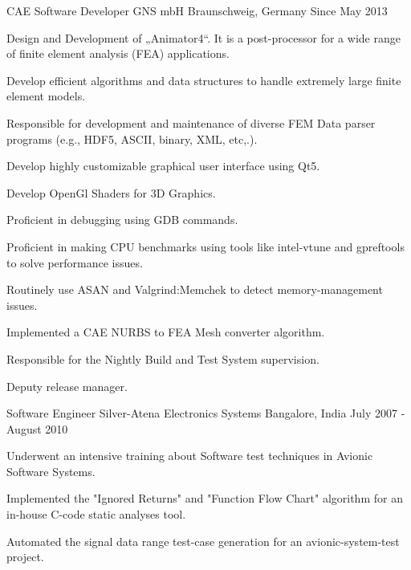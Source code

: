 
\begin{cventries}
\cventry
    {CAE Software Developer}
    {GNS mbH}
    {Braunschweig, Germany}
    {Since May 2013 }
    {
      \begin{cvitems}
        \item {Design and Development of „Animator4“. It is a post-processor for a wide range of finite element analysis (FEA) applications.}
        \item {Develop efficient algorithms and data structures to handle extremely large finite element models.}
        \item {Responsible for development and maintenance of diverse FEM Data parser programs (e.g., HDF5, ASCII, binary, XML, etc,.).}
        \item {Develop highly customizable graphical user interface using Qt5.}
        \item {Develop OpenGl Shaders for 3D Graphics.}
        \item {Proficient in debugging using GDB commands.}
        \item {Proficient in making CPU benchmarks using tools like intel-vtune and gpreftools to solve performance issues.}
        \item {Routinely use ASAN and Valgrind:Memchek to detect memory-management issues.}
        \item {Implemented a CAE NURBS to FEA Mesh converter algorithm.}
        \item {Responsible for the Nightly Build and Test System supervision.}
        \item {Deputy release manager.}
      \end{cvitems}
    }

\cventry
    {Software Engineer}
    {Silver-Atena Electronics Systems }
    {Bangalore, India}
    {July 2007 -  August 2010 }
    {
      \begin{cvitems}
        \item {Underwent an intensive training about Software test techniques in Avionic Software Systems.}
        \item {Implemented the "Ignored Returns" and "Function Flow Chart" algorithm for an in-house C-code static analyses tool.}
        \item {Automated the signal data range test-case generation for an avionic-system-test project.}                       
      \end{cvitems}
    }
\end{cventries}


